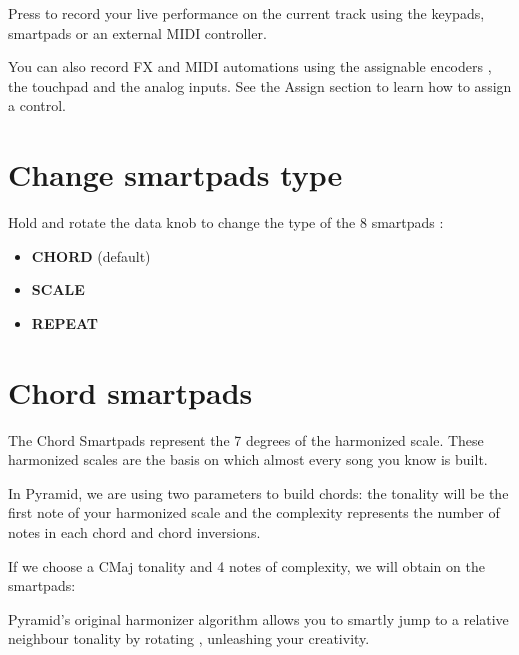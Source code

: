 Press  to record your live performance on the current track using the keypads, smartpads or an external MIDI controller.

You can also record FX and MIDI automations using the assignable encoders \encodersicon{}, the touchpad \touchpadicon{} and the analog inputs. See the Assign section to learn how to assign a control.



\section{Change smartpads type}

Hold  and rotate the data knob \encodericon{} to change the type of the 8 smartpads \smartpadsicon{}:

\begin{itemize}
\item \textbf{CHORD} (default)
\item \textbf{SCALE}
\item \textbf{REPEAT}
\end{itemize}


\section{Chord smartpads}

The Chord Smartpads represent the 7 degrees of the harmonized scale. These harmonized scales are the basis on which almost every song you know is built.

In Pyramid, we are using two parameters to build chords: the tonality will be the first note of your harmonized scale and the complexity represents the number of notes in each chord and chord inversions.

If we choose a CMaj tonality and 4 notes of complexity, we will obtain on the smartpads: 


Pyramid's original harmonizer algorithm allows you to smartly jump to a relative neighbour tonality by rotating \encodericon{}, unleashing your creativity.

